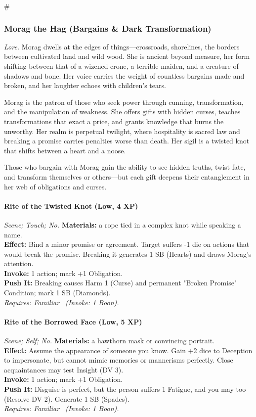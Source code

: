 # %

\subsubsection{Morag the Hag (Bargains \& Dark Transformation)}
\textit{Lore.} Morag dwells at the edges of things—crossroads, shorelines, the borders between cultivated land and wild wood. She is ancient beyond measure, her form shifting between that of a wizened crone, a terrible maiden, and a creature of shadows and bone. Her voice carries the weight of countless bargains made and broken, and her laughter echoes with children's tears.

Morag is the patron of those who seek power through cunning, transformation, and the manipulation of weakness. She offers gifts with hidden curses, teaches transformations that exact a price, and grants knowledge that burns the unworthy. Her realm is perpetual twilight, where hospitality is sacred law and breaking a promise carries penalties worse than death. Her sigil is a twisted knot that shifts between a heart and a noose.

Those who bargain with Morag gain the ability to see hidden truths, twist fate, and transform themselves or others—but each gift deepens their entanglement in her web of obligations and curses.

\paragraph*{Rite of the Twisted Knot (Low, 4 XP)} \emph{Scene; Touch; No.}
\textbf{Materials:} a rope tied in a complex knot while speaking a name.\\
\textbf{Effect:} Bind a minor promise or agreement. Target suffers -1 die on actions that would break the promise. Breaking it generates 1 SB (Hearts) and draws Morag's attention.\\
\textbf{Invoke:} 1 action; mark +1 Obligation.\\
\textbf{Push It:} Breaking causes Harm 1 (Curse) and permanent "Broken Promise" Condition; mark 1 SB (Diamonds).\\
\emph{Requires: Familiar \ (\textit{Invoke:} 1 Boon).}

\paragraph*{Rite of the Borrowed Face (Low, 5 XP)} \emph{Scene; Self; No.}
\textbf{Materials:} a hawthorn mask or convincing portrait.\\
\textbf{Effect:} Assume the appearance of someone you know. Gain +2 dice to Deception to impersonate, but cannot mimic memories or mannerisms perfectly. Close acquaintances may test Insight (DV 3).\\
\textbf{Invoke:} 1 action; mark +1 Obligation.\\
\textbf{Push It:} Disguise is perfect, but the person suffers 1 Fatigue, and you may too (Resolve DV 2). Generate 1 SB (Spades).\\
\emph{Requires: Familiar \ (\textit{Invoke:} 1 Boon).}


